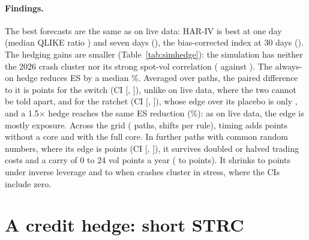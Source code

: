 \documentclass[10pt,a4paper]{article}
\begin{document}
\paragraph{Findings.} The best forecasts are the same as on live data: HAR-IV is best at one day (median QLIKE ratio \QlHarIvOne) and seven days (\QlHarIvSeven), the bias-corrected index at 30 days (\QlIvThirty). The hedging gains are smaller (Table~\ref{tab:simhedge}): the simulation has neither the 2026 crash cluster nor its strong spot-vol correlation (\LiveCorrD{} against \CorrDaily). The always-on hedge reduces ES by a median \EsRedAlways\%. Averaged over paths, the paired difference to it is \DEsSwitch{} points for the switch (CI [\DEsSwitchLo, \DEsSwitchHi]), unlike on live data, where the two cannot be told apart, and \DEsRatchet{} for the ratchet (CI [\DEsRatchetLo, \DEsRatchetHi]), whose edge over its placebo is only \DEsPlacebo{}, and a 1.5$\times$ hedge reaches the same ES reduction (\EsRedAlwaysOnehalf\%): as on live data, the edge is mostly exposure. Across the grid (\PgridPaths{} paths, \PgridShifts{} shifts per rule), timing adds \PgridFloorZero{} points without a core and \PgridFloorOne{} with the full core. In \NRobust{} further paths with common random numbers, where its edge is \RobBaseline{} points (CI [\RobLoBaseline, \RobHiBaseline]), it survives doubled or halved trading costs and a carry of 0 to 24 vol points a year (\RobCostMin{} to \RobCostMax{} points). It shrinks to \RobInverseLeverage{} points under inverse leverage and to \RobCrashesClusterInStress{} when crashes cluster in stress, where the CIs include zero.

\section{A credit hedge: short STRC}\label{sec:strc}
\end{document}
